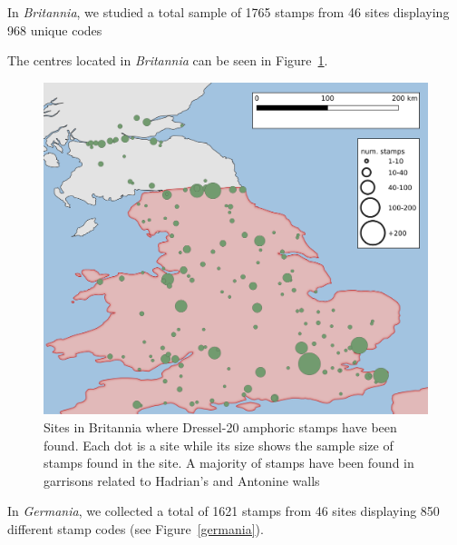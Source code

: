 \documentclass[review]{elsarticle}
\newcommand{\memo}[2]{\textcolor{#1}{#2}}
\newcommand{\xavi}[1]{\memo{magenta}{XRC: #1\\}}
\begin{document}
In \textit{Britannia}, we studied a total sample of 1765 stamps from 46 sites displaying 968 unique codes


The centres located in \textit{Britannia} can be seen in Figure~\ref{britannia}.
 
\begin{figure}[htp]
	\centering
\includegraphics[width=\linewidth]{figs/britannia}
\caption{Sites in Britannia where Dressel-20 amphoric stamps have been found. Each dot is a site while its size shows the sample size of stamps found in the site. A majority of stamps have been found in garrisons related to Hadrian's and Antonine walls}
\label{britannia}
\end{figure} 



In \textit{Germania}, we collected a total of 1621 stamps from 46 sites displaying 850 different stamp codes (see Figure~\ref{germania}). 
\end{document}
